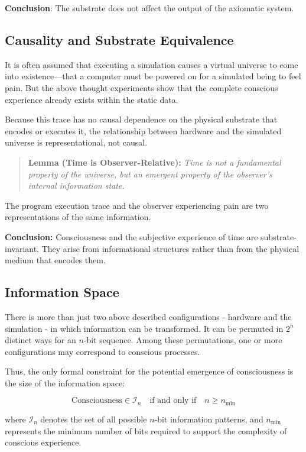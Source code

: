 \documentclass[11pt]{article}
\begin{document}
\textbf{Conclusion}: The substrate does not affect the output of the axiomatic system.



\subsection{Causality and Substrate Equivalence}

It is often assumed that executing a simulation causes a virtual universe to come into existence—that a computer must be powered on for a simulated being to feel pain. But the above thought experiments show that the complete conscious experience already exists within the static data.

Because this trace has no causal dependence on the physical substrate that encodes or executes it, the relationship between hardware and the simulated universe is representational, not causal.

\begin{quote}
  \textbf{Lemma (Time is Observer-Relative):} \emph{Time is not a fundamental property of the universe, but an emergent property of the observer’s internal information state.}
\end{quote}

The program execution trace and the observer experiencing pain are two representations of the same information.

\textbf{Conclusion:} Consciousness and the subjective experience of time are substrate-invariant. They arise from informational structures rather than from the physical medium that encodes them.



\subsection{Information Space}

There is more than just two above described configurations - hardware and the simulation - in which information can be transformed. It can be permuted in $2^n$ distinct ways for an $n$-bit sequence. Among these permutations, one or more configurations may correspond to conscious processes.

Thus, the only formal constraint for the potential emergence of consciousness is the size of the information space:

\[
  \text{Consciousness} \in \mathcal{I}_n \quad \text{if and only if} \quad n \geq n_{\text{min}}
\]

where $\mathcal{I}_n$ denotes the set of all possible $n$-bit information patterns, and $n_{\text{min}}$ represents the minimum number of bits required to support the complexity of conscious experience.
\end{document}
